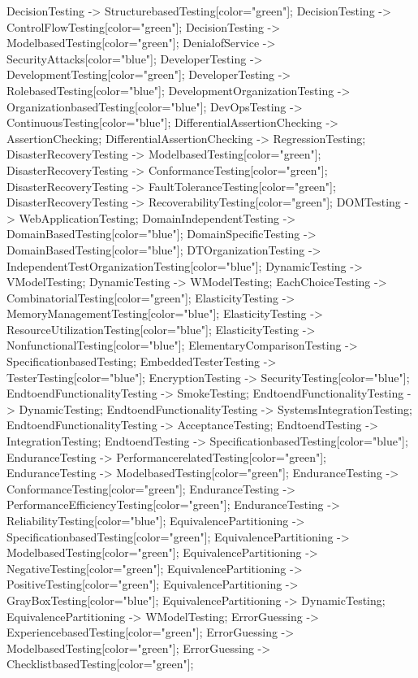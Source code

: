 \documentclass{article}
\begin{document}
{DecisionTesting -> StructurebasedTesting[color="green"];
DecisionTesting -> ControlFlowTesting[color="green"];
DecisionTesting -> ModelbasedTesting[color="green"];
DenialofService -> SecurityAttacks[color="blue"];
DeveloperTesting -> DevelopmentTesting[color="green"];
DeveloperTesting -> RolebasedTesting[color="blue"];
DevelopmentOrganizationTesting -> OrganizationbasedTesting[color="blue"];
DevOpsTesting -> ContinuousTesting[color="blue"];
DifferentialAssertionChecking -> AssertionChecking;
DifferentialAssertionChecking -> RegressionTesting;
DisasterRecoveryTesting -> ModelbasedTesting[color="green"];
DisasterRecoveryTesting -> ConformanceTesting[color="green"];
DisasterRecoveryTesting -> FaultToleranceTesting[color="green"];
DisasterRecoveryTesting -> RecoverabilityTesting[color="green"];
DOMTesting -> WebApplicationTesting;
DomainIndependentTesting -> DomainBasedTesting[color="blue"];
DomainSpecificTesting -> DomainBasedTesting[color="blue"];
DTOrganizationTesting -> IndependentTestOrganizationTesting[color="blue"];
DynamicTesting -> VModelTesting;
DynamicTesting -> WModelTesting;
EachChoiceTesting -> CombinatorialTesting[color="green"];
ElasticityTesting -> MemoryManagementTesting[color="blue"];
ElasticityTesting -> ResourceUtilizationTesting[color="blue"];
ElasticityTesting -> NonfunctionalTesting[color="blue"];
ElementaryComparisonTesting -> SpecificationbasedTesting;
EmbeddedTesterTesting -> TesterTesting[color="blue"];
EncryptionTesting -> SecurityTesting[color="blue"];
EndtoendFunctionalityTesting -> SmokeTesting;
EndtoendFunctionalityTesting -> DynamicTesting;
EndtoendFunctionalityTesting -> SystemsIntegrationTesting;
EndtoendFunctionalityTesting -> AcceptanceTesting;
EndtoendTesting -> IntegrationTesting;
EndtoendTesting -> SpecificationbasedTesting[color="blue"];
EnduranceTesting -> PerformancerelatedTesting[color="green"];
EnduranceTesting -> ModelbasedTesting[color="green"];
EnduranceTesting -> ConformanceTesting[color="green"];
EnduranceTesting -> PerformanceEfficiencyTesting[color="green"];
EnduranceTesting -> ReliabilityTesting[color="blue"];
EquivalencePartitioning -> SpecificationbasedTesting[color="green"];
EquivalencePartitioning -> ModelbasedTesting[color="green"];
EquivalencePartitioning -> NegativeTesting[color="green"];
EquivalencePartitioning -> PositiveTesting[color="green"];
EquivalencePartitioning -> GrayBoxTesting[color="blue"];
EquivalencePartitioning -> DynamicTesting;
EquivalencePartitioning -> WModelTesting;
ErrorGuessing -> ExperiencebasedTesting[color="green"];
ErrorGuessing -> ModelbasedTesting[color="green"];
ErrorGuessing -> ChecklistbasedTesting[color="green"];
}
\end{document}
